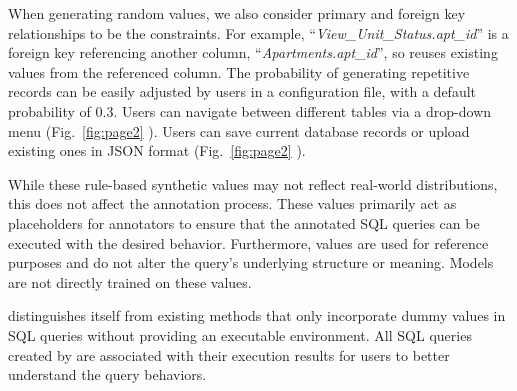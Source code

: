 When generating random values, we also consider primary and foreign key relationships to be the constraints.
For example, ``\textit{View\_Unit\_Status.apt\_id}'' is a foreign key referencing another column, ``\textit{Apartments.apt\_id}'', so {\tool} reuses existing values from the referenced column.
The probability of generating repetitive records can be easily adjusted by users in a configuration file, with a default probability of $0.3$.
Users can navigate between different tables via a drop-down menu (Fig.~\ref{fig:page2} ). 
Users can save current database records or upload existing ones in JSON format (Fig.~\ref{fig:page2} ).


While these rule-based synthetic values may not reflect real-world distributions, this does not affect the annotation process. 
These values primarily act as placeholders for annotators to ensure that the annotated SQL queries can be executed with the desired behavior. 
Furthermore, values are used for reference purposes and do not alter the query's underlying structure or meaning. Models are not directly trained on these values. 



{\tool} distinguishes itself from existing methods that only incorporate dummy values in SQL queries without providing an executable environment.
All SQL queries created by {\tool} are associated with their execution results for users to better understand the query behaviors.







